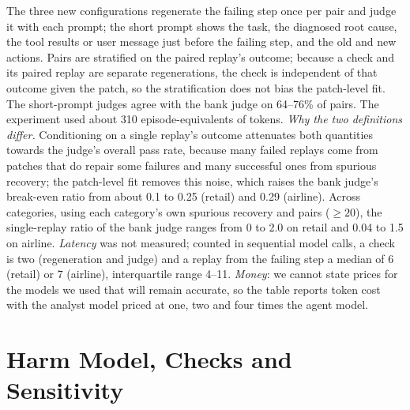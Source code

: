 \documentclass[11pt]{article}
\begin{document}
The three new configurations regenerate the failing step once per pair and judge it with each prompt; the short prompt shows the task, the diagnosed root cause, the tool results or user message just before the failing step, and the old and new actions. Pairs are stratified on the paired replay's outcome; because a check and its paired replay are separate regenerations, the check is independent of that outcome given the patch, so the stratification does not bias the patch-level fit. The short-prompt judges agree with the bank judge on 64--76\% of pairs. The experiment used about 310 episode-equivalents of tokens. \emph{Why the two definitions differ.} Conditioning on a single replay's outcome attenuates both quantities towards the judge's overall pass rate, because many failed replays come from patches that do repair some failures and many successful ones from spurious recovery; the patch-level fit removes this noise, which raises the bank judge's break-even ratio from about 0.1 to 0.25 (retail) and 0.29 (airline). Across categories, using each category's own spurious recovery and pairs ($\ge20$), the single-replay ratio of the bank judge ranges from 0 to 2.0 on retail and 0.04 to 1.5 on airline. \emph{Latency} was not measured; counted in sequential model calls, a check is two (regeneration and judge) and a replay from the failing step a median of 6 (retail) or 7 (airline), interquartile range 4--11. \emph{Money}: we cannot state prices for the models we used that will remain accurate, so the table reports token cost with the analyst model priced at one, two and four times the agent model.

\section{Harm Model, Checks and Sensitivity}
\label{app:harm}
\end{document}
